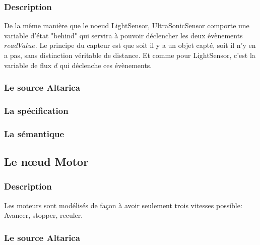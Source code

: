    \subsubsection{Description}
   De la même manière que le noeud LightSensor, UltraSonicSensor
   comporte une variable d'état "behind" qui servira à pouvoir déclencher les deux évènements $readValue$. Le principe du capteur est que soit il y a un objet capté, soit il n'y en a pas, sans distinction véritable de distance. Et comme pour LightSensor, c'est la variable de flux $d$ qui déclenche ces évènements. 

   \subsubsection{Le source Altarica}
   
   
   \subsubsection{La spécification}
   
   
   \subsubsection{La sémantique}

  \subsection{Le n\oe{}ud Motor}
  
   \subsubsection{Description}
   Les moteurs sont modélisés de façon à avoir seulement trois vitesses
   possible: Avancer, stopper, reculer.

   \subsubsection{Le source Altarica}
   
   
